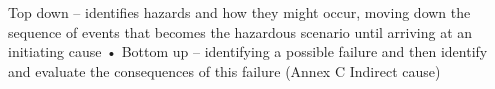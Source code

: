 Top down
– identifies hazards and how they might occur, moving
down the sequence of events that becomes the
hazardous scenario until arriving at an initiating cause
• Bottom up
– identifying a possible failure and then identify and
evaluate the consequences of this failure (Annex C
Indirect cause)




